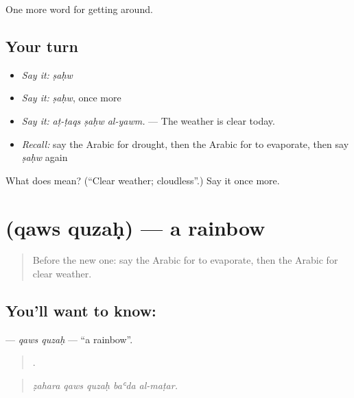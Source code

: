\begin{grammarlens}[title={What you've built}]
One more word for getting around.
\end{grammarlens}

\subsection*{Your turn}
\begin{itemize}
\raggedright
  \item \emph{Say it:} \emph{ṣaḥw}
  \item \emph{Say it:} \emph{ṣaḥw}, once more
  \item \emph{Say it:} \emph{aṭ-ṭaqs ṣaḥw al-yawm.} — The weather is clear today.
  \item \emph{Recall:} say the Arabic for drought, then the Arabic for to evaporate, then say \emph{ṣaḥw} again
\end{itemize}

\begin{tcolorbox}[breakable,colback=teal!4,colframe=teal!35!black,title={Before you move on}]
What does  mean? (\textquotedblleft{}Clear weather; cloudless\textquotedblright{}.) Say it once more.
\end{tcolorbox}
\section[\texorpdfstring{\ar{قوس} \ar{قزح} (qaws quzaḥ)}{قوس قزح (qaws quzaḥ)}]{  (qaws quzaḥ) — a rainbow}

\label{lesson:AR-C485-qaws-quzah}



\begin{quote}
Before the new one: say the Arabic for to evaporate, then the Arabic for clear weather.
\end{quote}

\subsection*{You'll want to know:  }
\textbf{ } — \emph{qaws quzaḥ} — \textquotedblleft{}a rainbow\textquotedblright{}.

\begin{quote}
    .
\end{quote}

\begin{quote}
\emph{ẓahara qaws quzaḥ baʿda al-maṭar.}
\end{quote}

